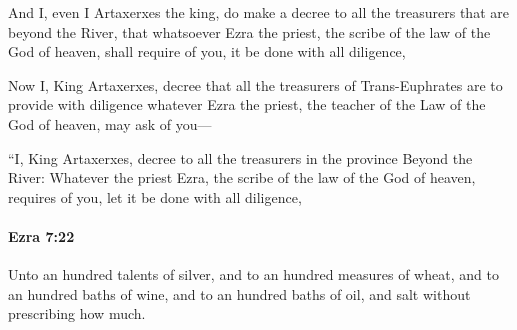 			\begin{versebox}
					\item[BHS] 
					\item[LXX] 
					\item[ASV] And I, even I Artaxerxes the king, do make a decree to all the treasurers that are beyond the River, that whatsoever Ezra the priest, the scribe of the law of the God of heaven, shall require of you, it be done with all diligence,
					\item[NIV] Now I, King Artaxerxes, decree that all the treasurers of Trans-Euphrates are to provide with diligence whatever Ezra the priest, the teacher of the Law of the God of heaven, may ask of you—
					\item[NRSV] “I, King Artaxerxes, decree to all the treasurers in the province Beyond the River: Whatever the priest Ezra, the scribe of the law of the God of heaven, requires of you, let it be done with all diligence,
			\end{versebox}

		\paragraph{Ezra 7:22} %
			\label{EZRA-7-22}

			Unto an hundred talents of silver, and to an hundred measures of wheat, and to an hundred baths of wine, and to an hundred baths of oil, and salt without prescribing how much.

